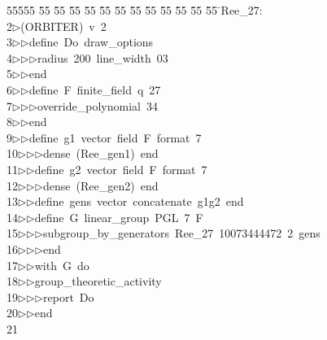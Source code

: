%
%
\begin{tabbing}
55555 \= 55 \= 55 \= 55 \= 55 \= 55 \= 55 \= 55 \= 55 \= 55 \= 55 \= 55 \= 55 \= \>Ree\_27:\\[0pt]
2\>$\triangleright$\>(ORBITER)\ v\ 2\ \\[0pt]
3\>$\triangleright$\>$\triangleright$\>define\ Do\ draw\_options\ \\[0pt]
4\>$\triangleright$\>$\triangleright$\>$\triangleright$\>radius\ 200\ line\_width\ 03\ \\[0pt]
5\>$\triangleright$\>$\triangleright$\>end\ \\[0pt]
6\>$\triangleright$\>$\triangleright$\>define\ F\ finite\_field\ q\ 27\ \\[0pt]
7\>$\triangleright$\>$\triangleright$\>$\triangleright$\>override\_polynomial\ 34\ \\[0pt]
8\>$\triangleright$\>$\triangleright$\>end\ \\[0pt]
9\>$\triangleright$\>$\triangleright$\>define\ g1\ vector\ field\ F\ format\ 7\ \\[0pt]
10\>$\triangleright$\>$\triangleright$\>$\triangleright$\>dense\ (Ree\_gen1)\ end\ \\[0pt]
11\>$\triangleright$\>$\triangleright$\>define\ g2\ vector\ field\ F\ format\ 7\ \\[0pt]
12\>$\triangleright$\>$\triangleright$\>$\triangleright$\>dense\ (Ree\_gen2)\ end\ \\[0pt]
13\>$\triangleright$\>$\triangleright$\>define\ gens\ vector\ concatenate\ g1g2\ end\ \\[0pt]
14\>$\triangleright$\>$\triangleright$\>define\ G\ linear\_group\ PGL\ 7\ F\ \\[0pt]
15\>$\triangleright$\>$\triangleright$\>$\triangleright$\>subgroup\_by\_generators\ Ree\_27\ 10073444472\ 2\ gens\ \\[0pt]
16\>$\triangleright$\>$\triangleright$\>$\triangleright$\>end\ \\[0pt]
17\>$\triangleright$\>$\triangleright$\>with\ G\ do\ \\[0pt]
18\>$\triangleright$\>$\triangleright$\>group\_theoretic\_activity\ \\[0pt]
19\>$\triangleright$\>$\triangleright$\>$\triangleright$\>report\ Do\ \\[0pt]
20\>$\triangleright$\>$\triangleright$\>end\\[0pt]
21\>\end{tabbing}
